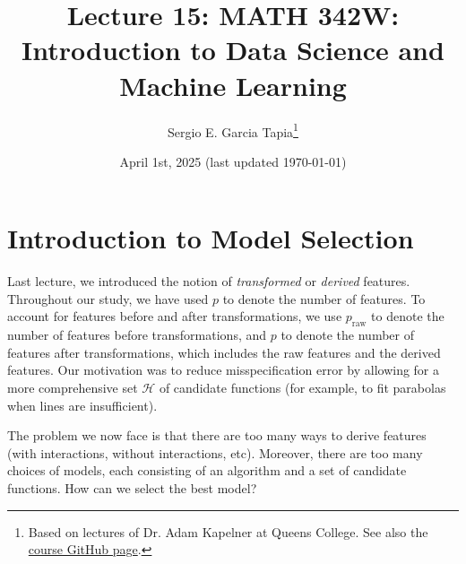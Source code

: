 \documentclass[12pt, a4paper]{article}
\title{Lecture 15: MATH 342W: Introduction to Data Science and Machine Learning}
\author{Sergio E. Garcia Tapia\thanks{Based on lectures of Dr. Adam Kapelner at Queens College.
See also the \href{https://github.com/kapelner/QC_MATH_342W_Spring_2025}{course GitHub page}.}}
\date{April 1st, 2025 (last updated \today)}
\theoremstyle{definition}
\begin{document}
	\maketitle
	\section*{Introduction to Model Selection}
	Last lecture, we introduced the notion of \textit{transformed} or \textit{derived}
	features. Throughout our study, we have used $p$ to denote the number of features.
	To account for features before and after transformations, we use $p_{\text{raw}}$
	to denote the number of features before transformations, and $p$ to denote
	the number of features after transformations, which includes the raw features
	and the derived features. Our motivation was to reduce misspecification
	error by allowing for a more comprehensive set $\mathcal{H}$ of candidate functions
	(for example, to fit parabolas when lines are insufficient).
	
	The problem we now face is that there are too many ways to derive features
	(with interactions, without interactions, etc). Moreover, there are too many choices
	of models, each consisting of an algorithm and a set of candidate functions.
	How can we select the best model?
	
\end{document}
